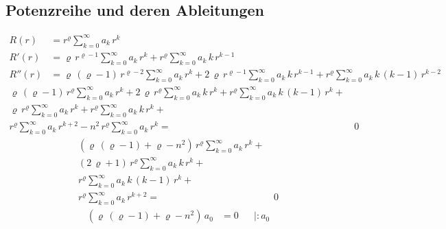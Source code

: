 \begin{refsection}
\subsection*{Potenzreihe und deren Ableitungen}
\begin{align*}
	R \left( r \right)
	&=
	r^{\varrho}
	\sum_{k=0}^{\infty} a_k \, r^k
\\
	R'\left( r \right)
	&=
	\varrho \, r^{\varrho - 1}
	\sum_{k=0}^{\infty} a_k \, r^k
	+
	r^{\varrho}
	\sum_{k=0}^{\infty} a_k \, k \, r^{k - 1}
\\
	R'' \left( r \right)
	&=
	\varrho \, \left( \varrho - 1 \right) \, r^{\varrho - 2}
	\sum_{k=0}^{\infty} a_k \, r^k
	+
	2 \, \varrho \, r^{\varrho - 1}
	\sum_{k=0}^{\infty} a_k \, k \, r^{k - 1}
	+
	r^{\varrho}
	\sum_{k=0}^{\infty} a_k \, k \, \left( k - 1 \right) \, r^{k - 2}	
\end{align*}
\begin{align*}
	\varrho \, \left( \varrho - 1 \right) \, r^{\varrho}
	\sum_{k=0}^{\infty} a_k \, r^k
	+
	2 \, \varrho \, r^{\varrho}
	\sum_{k=0}^{\infty} a_k \, k \, r^k
	+
	r^{\varrho}
	\sum_{k=0}^{\infty} a_k \, k \, \left( k - 1 \right) \, r^k
	+ \\
	\varrho \, r^{\varrho}
	\sum_{k=0}^{\infty} a_k \, r^k
	+
	r^{\varrho}
	\sum_{k=0}^{\infty} a_k \, k \, r^k
	+\\
	r^{\varrho}
	\sum_{k=0}^{\infty} a_k \, r^{k + 2}
	-
	n^2 \, r^{\varrho}
	\sum_{k=0}^{\infty} a_k \, r^k
	= & \, 0
\end{align*}
\begin{align*}
	\left(
	\varrho \, \left( \varrho - 1 \right)
	+
	\varrho
	-
	n^2
	\right)
	\, r^{\varrho}
	\sum_{k=0}^{\infty} a_k \, r^k
	+ \\
	\left(	
	2 \, \varrho
	+
	1
	\right)
	\, r^{\varrho}
	\sum_{k=0}^{\infty} a_k \, k \, r^k
	+ \\
	r^{\varrho}
	\sum_{k=0}^{\infty} a_k \, k \, \left( k - 1 \right) \, r^k
	+ \\
	r^{\varrho}
	\sum_{k=0}^{\infty} a_k \, r^{k + 2}
	= & \, 0
\end{align*}
\begin{align*}
	\left( \varrho \, \left( \varrho -1 \right) + \varrho - n^2 \right) \, a_0 &= 0 && \left| :a_0 \right. \\

\end{align*}
\end{refsection}
